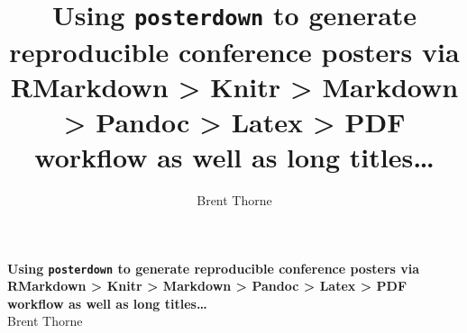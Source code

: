 \documentclass[article,30pt,extrafontsizes]{memoir}
\author{Brent Thorne}
\title{Using \color{Red} \texttt{posterdown} \color{White} to generate
reproducible conference posters via RMarkdown \textgreater{} Knitr
\textgreater{} Markdown \textgreater{} Pandoc \textgreater{} Latex
\textgreater{} PDF workflow as well as long titles\ldots{}}
\begin{document}
\begin{mdframed}[backgroundcolor=myframecolour,linecolor=Red,topline=false,leftline=false,rightline=false,linewidth=2mm]

\begingroup
  \centering
  \color{White}
\vspace{1in}
  \Huge\textbf{Using \color{Red} \texttt{posterdown} \color{White} to generate
reproducible conference posters via RMarkdown \textgreater{} Knitr
\textgreater{} Markdown \textgreater{} Pandoc \textgreater{} Latex
\textgreater{} PDF workflow as well as long titles\ldots{}}\\[0.3in]
  \Large Brent Thorne \par
\vspace{1.2in}
  \endgroup
\end{mdframed}
\end{document}
